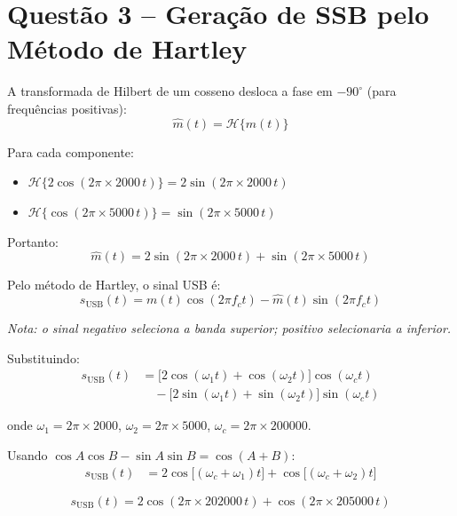 \documentclass[11pt,a4paper]{article}
\begin{document}
\section*{Questão 3 -- Geração de SSB pelo Método de Hartley}

\begin{resolucao}

A transformada de Hilbert de um cosseno desloca a fase em $-90^\circ$ (para frequências positivas):
\[
  \hat{m}(t) = \mathcal{H}\{m(t)\}
\]

Para cada componente:
\begin{itemize}
  \item $\mathcal{H}\{2\cos(2\pi \times 2000\,t)\} = 2\sin(2\pi \times 2000\,t)$
  \item $\mathcal{H}\{\cos(2\pi \times 5000\,t)\} = \sin(2\pi \times 5000\,t)$
\end{itemize}

Portanto:
\[
  \boxed{\hat{m}(t) = 2\sin(2\pi \times 2000\,t) + \sin(2\pi \times 5000\,t)}
\]
\end{resolucao}

\begin{resolucao}

Pelo método de Hartley, o sinal USB é:
\[
  s_{\text{USB}}(t) = m(t)\cos(2\pi f_c t) - \hat{m}(t)\sin(2\pi f_c t)
\]

\textit{Nota: o sinal negativo seleciona a banda superior; positivo selecionaria a inferior.}

Substituindo:
\begin{align*}
  s_{\text{USB}}(t) &= \big[2\cos(\omega_1 t) + \cos(\omega_2 t)\big]\cos(\omega_c t) \\
  &\quad - \big[2\sin(\omega_1 t) + \sin(\omega_2 t)\big]\sin(\omega_c t)
\end{align*}

onde $\omega_1 = 2\pi \times 2000$, $\omega_2 = 2\pi \times 5000$, $\omega_c = 2\pi \times 200000$.

Usando $\cos A \cos B - \sin A \sin B = \cos(A+B)$:
\begin{align*}
  s_{\text{USB}}(t) &= 2\cos\!\big[(\omega_c + \omega_1)t\big] + \cos\!\big[(\omega_c + \omega_2)t\big]
\end{align*}

\[
  \boxed{s_{\text{USB}}(t) = 2\cos(2\pi \times 202000\,t) + \cos(2\pi \times 205000\,t)}
\]
\end{resolucao}
\end{document}
